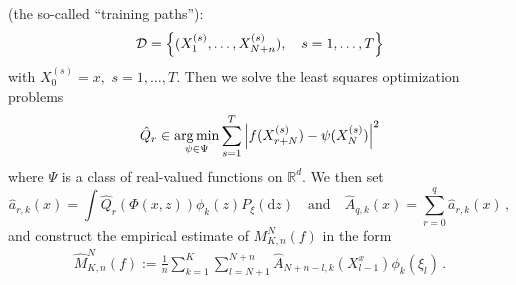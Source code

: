 \documentclass[bj]{imsart}
\def\rmd{\mathrm{d}}
\def\NtrainPath{T}
\def\TrainSet{\mathcal{D}}
\newcommand*{\argmin}{\operatornamewithlimits{arg\,min}}
\def\eqsp{\,}
\begin{document}
(the so-called ``training paths''):
\[
\TrainSet=\Bigl\{(X^{(s)}_{1},\ldots,X^{(s)}_{N+n}),\quad s=1,\ldots,\NtrainPath\Bigr\}
\]
with $X^{(s)}_{0}=x,$ $s=1,\ldots,T.$
Then we solve  the least squares optimization problems
\begin{equation}\label{eq:06042018a1}
\hat{Q}_{r} \in \argmin_{\psi \in \Psi} \sum_{s = 1}^{T} \left|   f(X_{r+N}^{(s)}) - \psi(X^{(s)}_{N})\right|^2
\end{equation}
where \(\Psi\) is a  class of  real-valued functions on \(\mathbb{R}^d\).
We then set
\begin{equation}
\label{eq:definition-hat-a-A}
\hat{a}_{r,k}(x)= \int \hat{Q}_r(\Phi(x,z)) \phi_k(z) P_\xi(\rmd z) \quad \text{and}
\quad
\hat{A}_{q,k}(x) = \sum_{r=0}^q \hat{a}_{r,k}(x) \eqsp,
\end{equation}
and construct the empirical estimate  of \(M_{K,n}^N(f)\) in the form
\begin{eqnarray*}
\widehat M_{K,n}^N(f) := \frac{1}{n}\sum_{k=1}^{K}\sum_{l=N+1}^{N+n} \widehat{A}_{N+n-l,k}(X_{l-1}^{x})\phi_{k}(\xi_{l})\,.
\end{eqnarray*}
\end{document}
